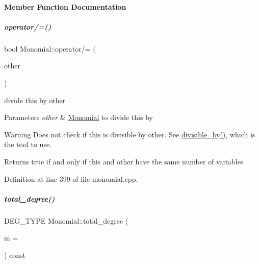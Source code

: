 \paragraph{Member Function Documentation}
\mbox{\label{group__polygroup_a764a69f76747cf8f5f58ef6473028204}} 
\subparagraph{\texorpdfstring{operator/=()}{operator/=()}}
{\footnotesize\ttfamily bool Monomial\+::operator/= (\begin{DoxyParamCaption}\item[{const \hyperlink{group__polygroup_class_monomial}{Monomial} \&}]{other }\end{DoxyParamCaption})}



divide {\ttfamily this} by {\ttfamily other} 


\begin{DoxyParams}{Parameters}
{\em other} & \hyperlink{group__polygroup_class_monomial}{Monomial} to divide {\ttfamily this} by \\
\hline
\end{DoxyParams}
\begin{DoxyWarning}{Warning}
Does not check if {\ttfamily this} is divisible by other. See \hyperlink{group__polygroup_aa0341b299fa1fcd4459f9a6810768f0e}{divisible\+\_\+by()}, which is the tool to use. 
\end{DoxyWarning}
\begin{DoxyReturn}{Returns}
{\ttfamily true} if and only if {\ttfamily this} and {\ttfamily other} have the same number of variables 
\end{DoxyReturn}


Definition at line 399 of file monomial.\+cpp.

\mbox{\label{group__polygroup_afe6df62857d9f58634d5f6c668f12d35}} 
\subparagraph{\texorpdfstring{total\+\_\+degree()}{total\_degree()}}
{\footnotesize\ttfamily D\+E\+G\+\_\+\+T\+Y\+PE Monomial\+::total\+\_\+degree (\begin{DoxyParamCaption}\item[{N\+V\+A\+R\+\_\+\+T\+Y\+PE}]{m = {} }\end{DoxyParamCaption}) const}



